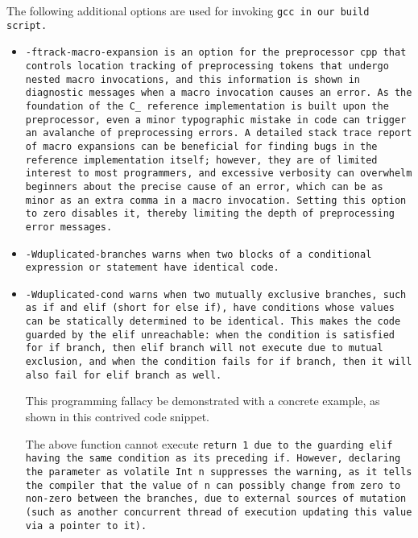 The following additional options are used
for invoking \tt{gcc} in our build script.

\begin{itemize}

\item \tt{-ftrack-macro-expansion} is an option for the preprocessor
\tt{cpp} that controls location tracking of preprocessing tokens
that undergo nested macro invocations, and this information is shown
in diagnostic messages when a macro invocation causes an error.
As the foundation of the C\_ reference implementation is
built upon the preprocessor, even a minor typographic mistake
in code can trigger an avalanche of preprocessing errors.
A detailed stack trace report of macro expansions can be
beneficial for finding bugs in the reference implementation itself;
however, they are of limited interest to most programmers, and excessive
verbosity can overwhelm beginners about the precise cause of an error,
which can be as minor as an extra comma in a macro invocation.
Setting this option to zero disables it, thereby
limiting the depth of preprocessing error messages.

\item \tt{-Wduplicated-branches} warns when two blocks of
a conditional expression or statement have identical code.

\item \tt{-Wduplicated-cond} warns when two mutually exclusive branches,
such as \tt{if} and \tt{elif} (short for \tt{else if}), have conditions
whose values can be statically determined to be identical.
This makes the code guarded by the \tt{elif} unreachable:
when the condition is satisfied for \tt{if} branch, then \tt{elif} branch
will not execute due to mutual exclusion, and when the condition fails
for \tt{if} branch, then it will also fail for \tt{elif} branch as well.

This programming fallacy be demonstrated with a concrete example,
as shown in this contrived code snippet.


The above function cannot execute \tt{return 1} due to the guarding
\tt{elif} having the same condition as its preceding \tt{if}.
However, declaring the parameter as \tt{volatile Int n} suppresses the warning,
as it tells the compiler that the value of \tt{n} can possibly change from zero
to non-zero between the branches, due to external sources of mutation (such as
another concurrent thread of execution updating this value via a pointer to it).


\end{itemize}

